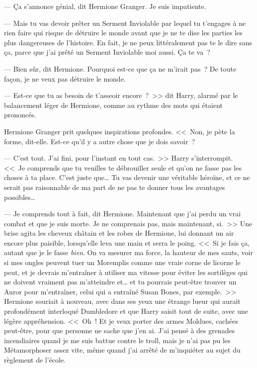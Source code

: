 --- Ça s'annonce génial, dit Hermione Granger. Je suis impatiente.

--- Mais tu vas devoir prêter un Serment Inviolable par lequel tu t'engages à ne rien faire qui risque de détruire le monde avant que je ne te dise les parties les plus dangereuses de l'histoire. En fait, je ne peux littéralement pas te le dire sans ça, parce que j'ai prêté un Serment Inviolable moi aussi. Ça te va~?

--- Bien sûr, dit Hermione. Pourquoi est-ce que ça ne m'irait pas~? De toute façon, je ne veux pas détruire le monde.

--- Est-ce que tu as besoin de t'asseoir encore~?~>> dit Harry, alarmé par le balancement léger de Hermione, comme au rythme des mots qui étaient prononcés.

Hermione Granger prit quelques inspirations profondes. <<~Non, je pète la forme, dit-elle. Est-ce qu'il y a autre chose que je dois savoir~?

--- C'est tout. J'ai fini, pour l'instant en tout cas.~>> Harry s'interrompit. <<~Je comprends que tu veuilles te débrouiller seule et qu'on ne fasse pas les choses à ta place. C'est juste que… Tu vas devenir une véritable héroïne, et ce ne serait pas raisonnable de ma part de ne pas te donner tous les avantages possibles…

--- Je comprends tout à fait, dit Hermione. Maintenant que j'ai perdu un vrai combat et que je suis morte. Je ne comprenais pas, mais maintenant, si.~>> Une brise agita les cheveux châtain et les robes de Hermione, lui donnant un air encore plus paisible, lorsqu'elle leva une main et serra le poing. <<~Si je fais ça, autant que je le fasse \emph{bien}. On va mesurer ma force, la hauteur de mes sauts, voir si mes ongles peuvent tuer un Moremplis comme une vraie corne de licorne le peut, et je devrais m'entraîner à utiliser ma vitesse pour éviter les sortilèges qui ne doivent vraiment pas m'atteindre et… et tu pourrais peut-être trouver un Auror pour m'entraîner, celui qui a entraîné Susan Bones, par exemple.~>> Hermione souriait à nouveau, avec dans ses yeux une étrange lueur qui aurait profondément interloqué Dumbledore et que Harry saisit tout de suite, avec une légère appréhension. <<~Oh~! Et je veux porter des armes Moldues, cachées peut-être, pour que personne ne sache que j'en ai. J'ai pensé à des grenades incendiaires quand je me suis battue contre le troll, mais je n'ai pas pu les Métamorphoser assez vite, même quand j'ai arrêté de m'inquiéter au sujet du règlement de l'école.

